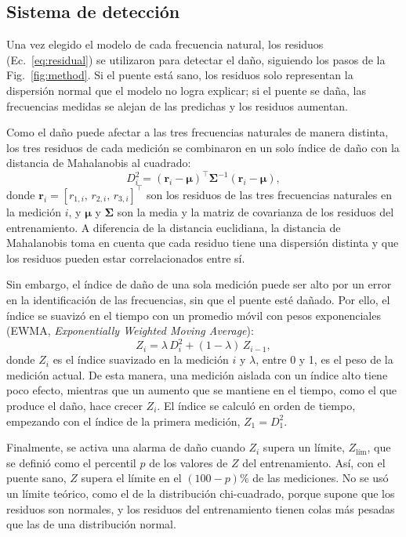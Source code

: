 \documentclass[9pt,twocolumn,twoside]{opticajnl}
\begin{document}
\subsection{Sistema de detección}
\label{sec:detection-system}

Una vez elegido el modelo de cada frecuencia natural, los residuos (Ec.~\eqref{eq:residual}) se utilizaron para detectar el daño, siguiendo los pasos de la Fig.~\ref{fig:method}. Si el puente está sano, los residuos solo representan la dispersión normal que el modelo no logra explicar; si el puente se daña, las frecuencias medidas se alejan de las predichas y los residuos aumentan.

Como el daño puede afectar a las tres frecuencias naturales de manera distinta, los tres residuos de cada medición se combinaron en un solo índice de daño con la distancia de Mahalanobis al cuadrado:
\begin{equation}
D_i^2 = \left(\mathbf{r}_i - \boldsymbol{\mu}\right)^\top \boldsymbol{\Sigma}^{-1} \left(\mathbf{r}_i - \boldsymbol{\mu}\right),
\label{eq:mahalanobis}
\end{equation}
donde $\mathbf{r}_i = [r_{1,i},\, r_{2,i},\, r_{3,i}]^\top$ son los residuos de las tres frecuencias naturales en la medición $i$, y $\boldsymbol{\mu}$ y $\boldsymbol{\Sigma}$ son la media y la matriz de covarianza de los residuos del entrenamiento. A diferencia de la distancia euclidiana, la distancia de Mahalanobis toma en cuenta que cada residuo tiene una dispersión distinta y que los residuos pueden estar correlacionados entre sí.

Sin embargo, el índice de daño de una sola medición puede ser alto por un error en la identificación de las frecuencias, sin que el puente esté dañado. Por ello, el índice se suavizó en el tiempo con un promedio móvil con pesos exponenciales (EWMA, \emph{Exponentially Weighted Moving Average}):
\begin{equation}
Z_i = \lambda\, D_i^2 + (1 - \lambda)\, Z_{i-1},
\label{eq:ewma}
\end{equation}
donde $Z_i$ es el índice suavizado en la medición $i$ y $\lambda$, entre 0 y 1, es el peso de la medición actual. De esta manera, una medición aislada con un índice alto tiene poco efecto, mientras que un aumento que se mantiene en el tiempo, como el que produce el daño, hace crecer $Z_i$. El índice se calculó en orden de tiempo, empezando con el índice de la primera medición, $Z_1 = D_1^2$.

Finalmente, se activa una alarma de daño cuando $Z_i$ supera un límite, $Z_\text{lím}$, que se definió como el percentil $p$ de los valores de $Z$ del entrenamiento. Así, con el puente sano, $Z$ supera el límite en el $(100-p)\%$ de las mediciones. No se usó un límite teórico, como el de la distribución chi-cuadrado, porque supone que los residuos son normales, y los residuos del entrenamiento tienen colas más pesadas que las de una distribución normal.
\end{document}
